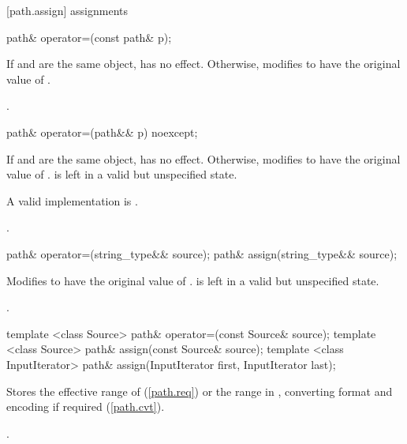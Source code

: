 [path.assign]{ assignments}

\begin{itemdecl}
path& operator=(const path& p);
\end{itemdecl}

\begin{itemdescr}
\pnum
\effects If  and  are the same
object, has no effect. Otherwise, modifies  to have the
original value of .

\pnum
\returns {}.
\end{itemdescr}

\begin{itemdecl}
path& operator=(path&& p) noexcept;
\end{itemdecl}

\begin{itemdescr}
\pnum
\effects If  and  are the same
object, has no effect. Otherwise, modifies  to have the
original value of .  is left in a
valid but unspecified state.
\begin{note} A valid implementation is . \end{note}

\pnum
\returns {}.
\end{itemdescr}

\begin{itemdecl}
path& operator=(string_type&& source);
path& assign(string_type&& source);
\end{itemdecl}

\begin{itemdescr}
\pnum
\effects Modifies  to have the original value of .
 is left in a valid but unspecified state.

\pnum
\returns {}.
\end{itemdescr}

\begin{itemdecl}
template <class Source>
  path& operator=(const Source& source);
template <class Source>
  path& assign(const Source& source);
template <class InputIterator>
  path& assign(InputIterator first, InputIterator last);
\end{itemdecl}

\begin{itemdescr}
\pnum
\effects Stores the effective range of  (\ref{path.req})
or the range  in ,
converting format and encoding if required (\ref{path.cvt}).

\pnum
\returns {}.
\end{itemdescr}

